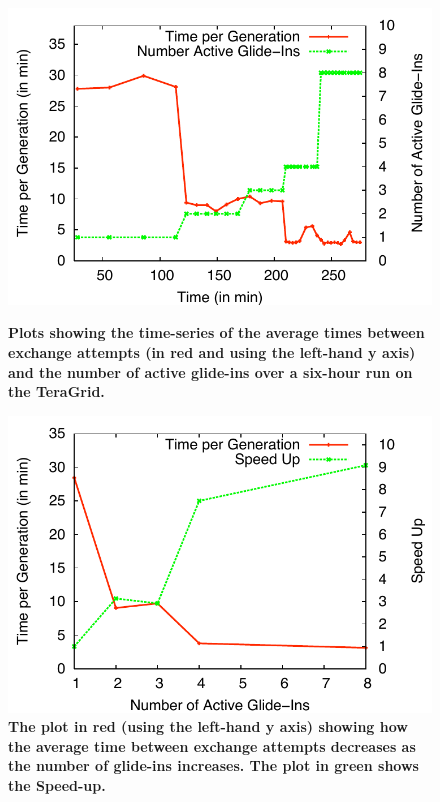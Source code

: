 \documentclass{rspublic}
\begin{document}
\begin{figure}[h]
  \begin{minipage}[t]{.495\textwidth}
    \begin{center}  
      \includegraphics[width=\textwidth]{performance/hepatitis/perf_repex.pdf}
      \caption{\footnotesize \bf Plots showing the time-series of the
        average times between exchange attempts (in red and using the
        left-hand y axis) and the number of active glide-ins over a
        six-hour run on the TeraGrid.}
      \label{fig:result_A}
    \end{center}
  \end{minipage}
  \hfill
  \begin{minipage}[t]{.48\textwidth}
    \begin{center}  
      \includegraphics[width=\textwidth]{performance/hepatitis/perf_repex2.pdf}
      \caption{\footnotesize \bf The plot in red (using the left-hand
        y axis) showing how the average time between exchange attempts
        decreases as the number of glide-ins increases. The plot in
        green shows the Speed-up.}
      \label{fig:result_B}
    \end{center}
  \end{minipage}
  \hfill
\end{figure}             
\end{document}
